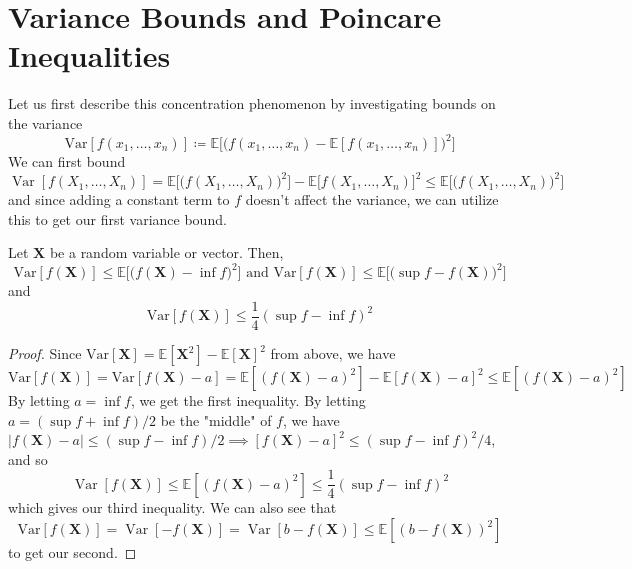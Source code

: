 \documentclass{article}
\DeclareMathOperator{\Var}{Var}
\begin{document}
\section{Variance Bounds and Poincare Inequalities}

  Let us first describe this concentration phenomenon by investigating bounds on the variance 
  \[\mathrm{Var}[f(x_1, \ldots, x_n)] \coloneqq \mathbb{E}\big[ \big( f(x_1, \ldots, x_n) - \mathbb{E}[f(x_1, \ldots, x_n)] \big)^2 \big] \]
  We can first bound 
  \[\Var[f(X_1, \ldots, X_n)] = \mathbb{E}\big[ \big( f(X_1, \ldots, X_n)\big)^2 \big] - \mathbb{E}\big[ f(X_1, \ldots, X_n) \big]^2 \leq \mathbb{E}\big[ \big( f(X_1, \ldots, X_n)\big)^2 \big]\]
  and since adding a constant term to $f$ doesn't affect the variance, we can utilize this to get our first variance bound. 

  \begin{lemma}
  Let $\mathbf{X}$ be a random variable or vector. Then, 
  \[\mathrm{Var}[f(\mathbf{X})] \leq \mathbb{E} \big[ \big( f(\mathbf{X}) - \inf f \big)^2 \big] \text{ and } \mathrm{Var}[f(\mathbf{X})] \leq \mathbb{E} \big[ \big(\sup f - f(\mathbf{X}) \big)^2 \big]\]
  and 
  \[\mathrm{Var}[ f(\mathbf{X})] \leq \frac{1}{4} ( \sup f - \inf f)^2\]
  \end{lemma}
  \begin{proof} 
  Since $\mathrm{Var}[\mathbf{X}] = \mathbb{E}[\mathbf{X}^2] - \mathbb{E}[\mathbf{X}]^2$ from above, we have 
  \[\mathrm{Var}[ f(\mathbf{X})] = \mathrm{Var}[f(\mathbf{X}) - a] = \mathbb{E}[(f(\mathbf{X}) - a)^2] - \mathbb{E}[f(\mathbf{X}) - a]^2 \leq \mathbb{E}[(f(\mathbf{X}) - a)^2]\]
  By letting $a = \inf f$, we get the first inequality. By letting $a = (\sup f + \inf f) /2$ be the "middle" of $f$, we have $|f(\mathbf{X}) - a| \leq (\sup f - \inf f)/2 \implies [f(\mathbf{X}) - a]^2 \leq (\sup f - \inf f)^2/4$, and so 
  \[\Var[ f(\mathbf{X})] \leq \mathbb{E}[(f(\mathbf{X}) - a)^2] \leq \frac{1}{4} (\sup f - \inf f)^2\]
  which gives our third inequality. We can also see that 
  \[\mathrm{Var}[ f(\mathbf{X})] = \Var[ -f (\mathbf{X})] = \Var[ b - f(\mathbf{X})] \leq \mathbb{E}[ (b - f(\mathbf{X}))^2]\]
  to get our second. 
  \end{proof} 
\end{document}

